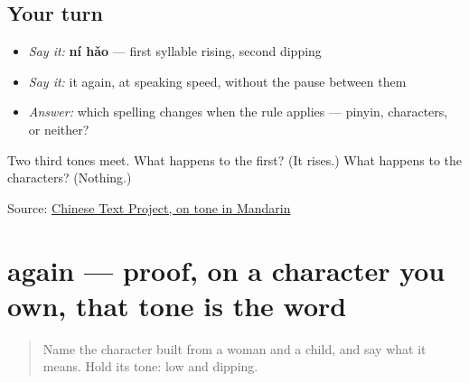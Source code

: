 \subsection*{Your turn}
\begin{itemize}
\raggedright
  \item \emph{Say it:} \textbf{ní hǎo} — first syllable rising, second dipping
  \item \emph{Say it:} it again, at speaking speed, without the pause between them
  \item \emph{Answer:} which spelling changes when the rule applies — pinyin, characters, or neither?
\end{itemize}

\begin{tcolorbox}[breakable,colback=teal!4,colframe=teal!35!black,title={Before you move on}]
Two third tones meet. What happens to the first? (It rises.) What happens to the characters? (Nothing.)

Source: \href{https://ctext.org/dictionary.pl}{Chinese Text Project, on tone in Mandarin}
\end{tcolorbox}
\section[\texorpdfstring{\zh{好} (hào)}{好 (hào)}]{ again — proof, on a character you own, that tone is the word}

\label{lesson:ZH-C01-hao-fond}



\begin{quote}
Name the character built from a woman and a child, and say what it means. Hold its tone: low and dipping.
\end{quote}

